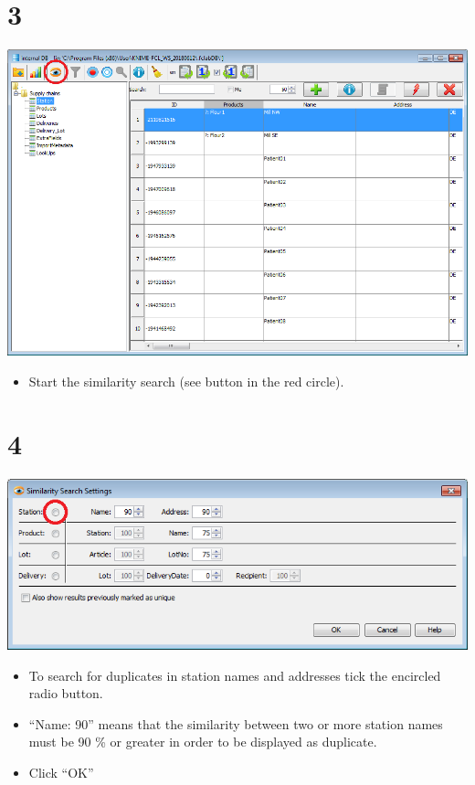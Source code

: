 \documentclass[10pt]{beamer}
\begin{document}
\section{3}
\begin{frame}
	\begin{center}
			\includegraphics[height=0.6\textheight]{3.png}
	\end{center}
	\begin{itemize}
		\item Start the similarity search (see button in the red circle).
	\end{itemize}
\end{frame}

\section{4}
\begin{frame}
	\begin{center}
			\includegraphics[scale=0.4]{4.png}
	\end{center}
	\begin{itemize}
		\item To search for duplicates in station names and addresses tick the encircled radio button.
		\item ``Name: 90'' means that the similarity between two or more station names must be 90 \% or greater in order to be displayed as duplicate.
		\item Click ``OK''
	\end{itemize}
\end{frame}
\end{document}
